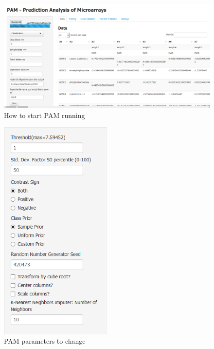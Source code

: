 \documentclass[12pt]{article}
\begin{document}
\begin{figure}
  \leavevmode
  \begin{center}
    \includegraphics[width=1\textwidth]{pam1.png}    
    \caption{How to start PAM running}
    \label{fig:pam-start}
  \end{center}
\end{figure}


\begin{figure}[htbp]
  \begin{center}
    \includegraphics[width=0.5\textwidth]{pam2.png}    
    \caption{PAM parameters to change}
    \label{fig:pam-parameters}
  \end{center}
\end{figure}
\end{document}
